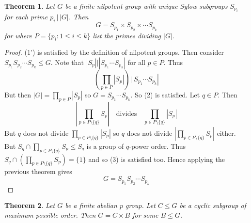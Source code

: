 \documentclass[a4paper,10pt]{article}
\newtheorem{thm}{Theorem}
\begin{document}
\begin{thm}
Let $G$ be a finite nilpotent group with unique Sylow subgroups $S_{p_i}$ for each prime $p_i \, \big| \, |G|$. Then 
\[ G = S_{p_1} \times S_{p_2} \times \cdots S_{p_k} \]
for where $P = \{p_i : 1 \leq i \leq k\}$ list the primes dividing $|G|$.
\end{thm}

\begin{proof}
(1') is satisfied by the definition of nilpotent groups. Then consider $S_{p_1} S_{p_2} \cdots S_{p_k} \leq G$. Note that $| S_p| \big| |S_{p_1} \cdots S_{p_k}|$ for all $p \in P$. Thus
\[ \left( \prod_{p \in P} |S_p| \right) \Big| | S_{p_1} \cdots S_{p_k} | \]
But then $|G| = \prod_{p \in P} |S_p|$ so $G = S_{p_1} \cdots S_{p_k}$. So (2) is satisfied. Let $q \in P$. Then 
\[ \left| \prod_{p \in P \setminus \{ q\}} S_p \right| \quad \text{divides} \quad \prod_{p \in P \setminus \{ q\}} |S_p| \]
But $q$ does not divide $\prod_{p \in P \setminus \{ q\}} |S_p|$ so $q$ does not divide $\left|\prod_{p \in P \setminus \{ q\}} S_p \right|$ either. But $S_q \cap \prod_{p \in P \setminus \{ q\}} S_p \leq S_q$ is a group of $q$-power order. Thus $S_q \cap \left( \prod_{p \in P \setminus \{ q\}} S_p \right) = \{ 1 \}$ and so (3) is satisfied too. Hence applying the previous theorem gives
\[ G = S_{p_1} S_{p_2} \cdots S_{p_k} \]
\end{proof}


\begin{thm}
Let $G$ be a finite abelian $p$ group. Let $C \leq G$ be a cyclic subgroup of maximum possible order. Then $G = C \times B$ for some $B \leq G$.
\end{thm}
\end{document}
